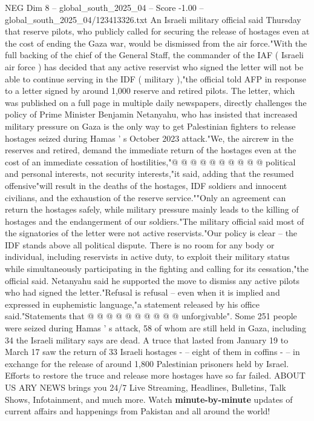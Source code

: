 \begin{textsample}{NEG Dim 8 – global\_south\_2025\_04 – Score -1.00 – global\_south\_2025\_04/123413326.txt}  \label{ex:f8_neg_287}
An Israeli military official said Thursday that reserve pilots, who publicly called for securing the release of hostages even at the cost of ending the Gaza war, would be dismissed from the air force."With the full backing of the chief of the General Staff, the commander of the IAF ( Israeli air force ) has decided that any active reservist who signed the letter will not be able to continue serving in the IDF ( military ),"the official told AFP in response to a letter signed by around 1,000 reserve and retired pilots.
The letter, which was published on a full page in multiple daily newspapers, directly challenges the policy of Prime Minister Benjamin Netanyahu, who has insisted that increased military pressure on Gaza is the only way to get Palestinian fighters to release hostages seized during Hamas ' s October 2023 attack."We, the aircrew in the reserves and retired, demand the immediate return of the hostages even at the cost of an immediate cessation of hostilities,"@ @ @ @ @ @ @ @ @ @ political and personal interests, not security interests,"it said, adding that the resumed offensive"will result in the deaths of the hostages, IDF soldiers and innocent civilians, and the exhaustion of the reserve service.""Only an agreement can return the hostages safely, while military pressure mainly leads to the killing of hostages and the endangerment of our soldiers."The military official said most of the signatories of the letter were not active reservists."Our policy is clear -- the IDF stands above all political dispute.
There is no room for any body or individual, including reservists in active duty, to exploit their military status while simultaneously participating in the fighting and calling for its cessation,"the official said.
Netanyahu said he supported the move to dismiss any active pilots who had signed the letter."Refusal is refusal -- even when it is implied and expressed in euphemistic language,"a statement released by his office said."Statements that @ @ @ @ @ @ @ @ @ @ unforgivable".
Some 251 people were seized during Hamas ' s attack, 58 of whom are still held in Gaza, including 34 the Israeli military says are dead.
A truce that lasted from January 19 to March 17 saw the return of 33 Israeli hostages - -- eight of them in coffins - -- in exchange for the release of around 1,800 Palestinian prisoners held by Israel.
Efforts to restore the truce and release more hostages have so far failed.
ABOUT US ARY NEWS brings you 24/7 Live Streaming, Headlines, Bulletins, Talk Shows, Infotainment, and much more.
Watch \textbf{minute-by-minute} updates of current affairs and happenings from Pakistan and all around the world!

\end{textsample}
